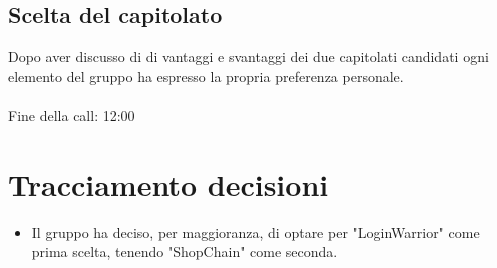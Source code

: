 \subsection{Scelta del capitolato}
Dopo aver discusso di di vantaggi e svantaggi dei due capitolati candidati ogni elemento del gruppo ha espresso la propria preferenza personale.\\
\\\noindent
Fine della call: 12:00

\section{Tracciamento decisioni}
\begin{itemize}
	\item Il gruppo ha deciso, per maggioranza, di optare per "LoginWarrior" come prima scelta, tenendo "ShopChain" come seconda.
\end{itemize}
